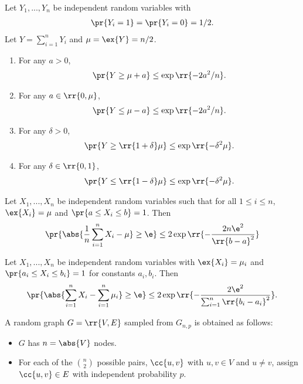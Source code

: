 \documentclass{article}
\begin{document}
\begin{corollary}
  Let $Y_1,...,Y_n$ be independent random variables with
  \begin{align*}
    \pr{Y_i=1}=\pr{Y_i=0}=1/2.
  \end{align*}
  Let $Y=\sum_{i=1}^{n} Y_i$ and $\mu=\ex{Y}=n/2$.
  \begin{enumerate}
    \item For any $a>0$, \begin{align*}
        \pr{Y\geq \mu+a}\leq \exp\rr{-2a^2/n}.
      \end{align*}
    \item For any $a\in\rr{0,\mu}$, \begin{align*}
        \pr{Y\leq \mu-a}\leq \exp\rr{-2a^2/n}.
      \end{align*}
    \item For any $\delta>0$, \begin{align*}
        \pr{Y\geq \rr{1+\delta}\mu}\leq \exp\rr{-\delta^2\mu}.
      \end{align*}
    \item For any $\delta\in\rr{0,1}$, \begin{align*}
        \pr{Y\leq \rr{1-\delta}\mu}\leq \exp\rr{-\delta^2\mu}.
      \end{align*}
  \end{enumerate}
\end{corollary}

\begin{theorem}
  Let $X_1,...,X_n$ be independent random variables such that for all $1\leq i\leq n$,
  $\ex{X_i}=\mu$ and $\pr{a\leq X_i\leq b}=1$. Then
  \begin{align*}
    \pr{\abs{\frac{1}{n}\sum_{i=1}^{n} X_i-\mu}\geq \e}\leq 2\exp\rr{-\frac{2n\e^2}{\rr{b-a}^2}}
  \end{align*}
\end{theorem}

\begin{theorem}
  Let $X_1,...,X_n$ be independent random variables with $\ex{X_i}=\mu_i$ and $\pr{a_i\leq X_i\leq b_i}=1$ for
  constants $a_i,b_i$. Then
  \begin{align*}
    \pr{\abs{\sum_{i=1}^{n} X_i - \sum_{i=1}^{n} \mu_i}\geq\e} \leq 2\exp\rr{-\frac{2\e^2}{\sum_{i=1}^{n} \rr{b_i-a_i}^2}}.
  \end{align*}
\end{theorem}

\begin{definition}
  A random graph $G=\rr{V,E}$ sampled from $G_{n,p}$ is obtained as follows:
  \begin{itemize}
    \item $G$ has $n=\abs{V}$ nodes.
    \item For each of the $\binom{n}{2}$ possible pairs, $\cc{u,v}$ with $u,v\in V$ and
      $u\neq v$, assign $\cc{u,v}\in E$ with independent probability $p$.
  \end{itemize}
\end{definition}
\end{document}
